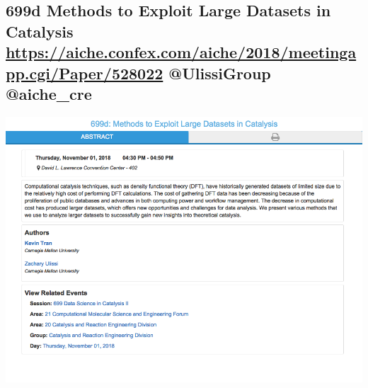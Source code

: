 \documentclass[11pt]{article}
\begin{document}
\subsection{699d Methods to Exploit Large Datasets in Catalysis \url{https://aiche.confex.com/aiche/2018/meetingapp.cgi/Paper/528022} @UlissiGroup @aiche\_cre}
\label{sec:org14725bb}
\begin{center}
\includegraphics[width=.9\linewidth]{./528022.png}
\end{center}
\end{document}
